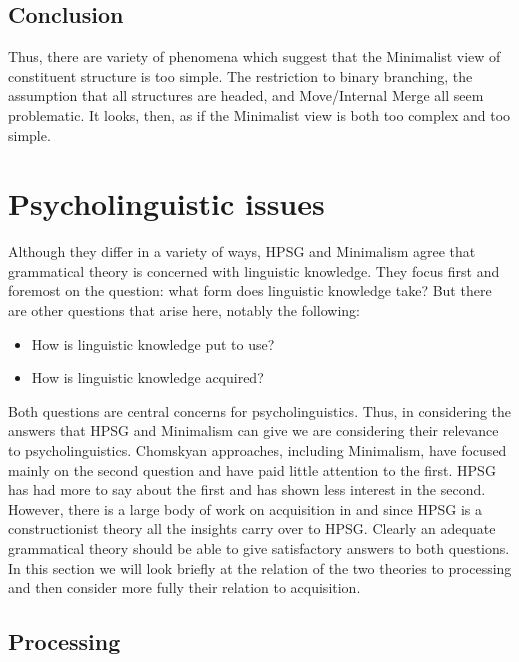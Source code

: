 \documentclass[output=paper]{langsci/langscibook}
\begin{document}
\subsection{Conclusion}

Thus, there are variety of phenomena which suggest that the Minimalist view of constituent structure
is too simple. The restriction to binary branching, the assumption that all structures are headed,
and Move/Internal Merge all seem problematic. It looks, then, as if the Minimalist view is both too
complex and too simple. 





\section{Psycholinguistic issues}
\label{sec-psycho}

Although they differ in a variety of ways, HPSG and Minimalism agree that grammatical theory is
concerned with linguistic knowledge. They focus first and foremost on the question: what form does
linguistic knowledge take? But there are other questions that arise here, notably the following: 

\begin{itemize}
\item How is linguistic knowledge put to use? 
\item How is linguistic knowledge acquired?
\end{itemize}

\noindent
Both questions are central concerns for psycholinguistics. Thus, in considering the answers that
HPSG and Minimalism can give we are considering their relevance to psycholinguistics. Chomskyan
approaches, including Minimalism, have focused mainly on the second question and have paid little
attention to the first. HPSG has had more to say about the first and has shown less interest in the
second. However, there is a large body of work on acquisition in  and
since HPSG is a constructionist theory  all the insights carry over to HPSG. 
Clearly an adequate grammatical theory should be able to give satisfactory answers to both
questions. In this section we will look briefly at the relation of the two theories to processing
and then consider more fully their relation to acquisition.


\subsection{Processing}
\label{sec-minimalism-processing}
\end{document}
